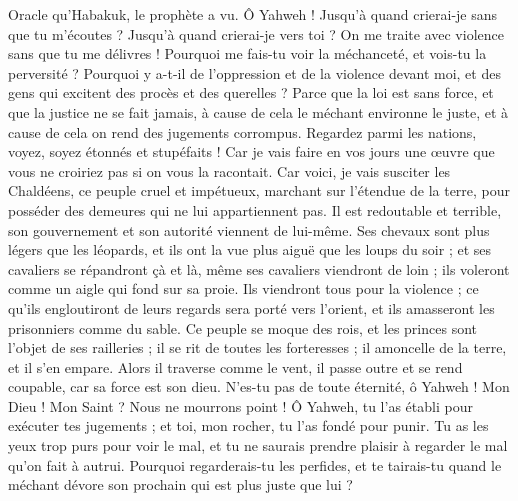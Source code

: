 \begin{multicols}{2}
\VerseOne{}Oracle qu'Habakuk, le prophète a vu.
Ô Yahweh ! Jusqu'à quand crierai-je sans que tu m'écoutes ? Jusqu'à quand crierai-je vers toi ? On me traite avec violence sans que tu me délivres !
Pourquoi me fais-tu voir la méchanceté, et vois-tu la perversité ? Pourquoi y a-t-il de l'oppression et de la violence devant moi, et des gens qui excitent des procès et des querelles ?
Parce que la loi est sans force, et que la justice ne se fait jamais, à cause de cela le méchant environne le juste, et à cause de cela on rend des jugements corrompus.
Regardez parmi les nations, voyez, soyez étonnés et stupéfaits ! Car je vais faire en vos jours une œuvre que vous ne croiriez pas si on vous la racontait.
Car voici, je vais susciter les Chaldéens, ce peuple cruel et impétueux, marchant sur l'étendue de la terre, pour posséder des demeures qui ne lui appartiennent pas.
Il est redoutable et terrible, son gouvernement et son autorité viennent de lui-même.
Ses chevaux sont plus légers que les léopards, et ils ont la vue plus aiguë que les loups du soir ; et ses cavaliers se répandront çà et là, même ses cavaliers viendront de loin ; ils voleront comme un aigle qui fond sur sa proie.
Ils viendront tous pour la violence ; ce qu'ils engloutiront de leurs regards sera porté vers l'orient, et ils amasseront les prisonniers comme du sable.
Ce peuple se moque des rois, et les princes sont l'objet de ses railleries ; il se rit de toutes les forteresses ; il amoncelle de la terre, et il s'en empare.
Alors il traverse comme le vent, il passe outre et se rend coupable, car sa force est son dieu.
N'es-tu pas de toute éternité, ô Yahweh ! Mon Dieu ! Mon Saint ? Nous ne mourrons point ! Ô Yahweh, tu l'as établi pour exécuter tes jugements ; et toi, mon rocher, tu l'as fondé pour punir.
Tu as les yeux trop purs pour voir le mal, et tu ne saurais prendre plaisir à regarder le mal qu'on fait à autrui. Pourquoi regarderais-tu les perfides, et te tairais-tu quand le méchant dévore son prochain qui est plus juste que lui ?

\end{multicols}
